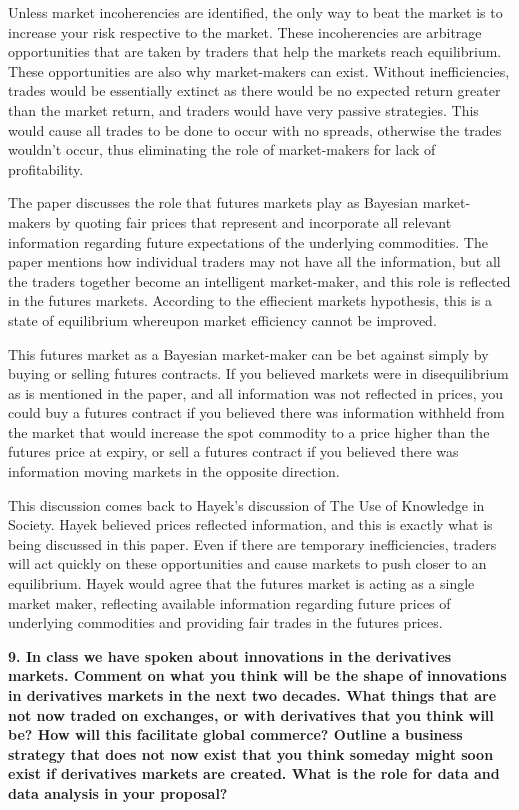 \documentclass[11pt]{article}
\begin{document}
Unless market incoherencies are identified, the only way to beat the
market is to increase your risk respective to the market. These
incoherencies are arbitrage opportunities that are taken by traders that
help the markets reach equilibrium. These opportunities are also why
market-makers can exist. Without inefficiencies, trades would be
essentially extinct as there would be no expected return greater than
the market return, and traders would have very passive strategies. This
would cause all trades to be done to occur with no spreads, otherwise
the trades wouldn't occur, thus eliminating the role of market-makers
for lack of profitability.

The paper discusses the role that futures markets play as Bayesian
market-makers by quoting fair prices that represent and incorporate all
relevant information regarding future expectations of the underlying
commodities. The paper mentions how individual traders may not have all
the information, but all the traders together become an intelligent
market-maker, and this role is reflected in the futures markets.
According to the effiecient markets hypothesis, this is a state of
equilibrium whereupon market efficiency cannot be improved.

This futures market as a Bayesian market-maker can be bet against simply
by buying or selling futures contracts. If you believed markets were in
disequilibrium as is mentioned in the paper, and all information was not
reflected in prices, you could buy a futures contract if you believed
there was information withheld from the market that would increase the
spot commodity to a price higher than the futures price at expiry, or
sell a futures contract if you believed there was information moving
markets in the opposite direction.

This discussion comes back to Hayek's discussion of The Use of Knowledge
in Society. Hayek believed prices reflected information, and this is
exactly what is being discussed in this paper. Even if there are
temporary inefficiencies, traders will act quickly on these
opportunities and cause markets to push closer to an equilibrium. Hayek
would agree that the futures market is acting as a single market maker,
reflecting available information regarding future prices of underlying
commodities and providing fair trades in the futures prices.

    \textbf{9. In class we have spoken about innovations in the derivatives
markets. Comment on what you think will be the shape of innovations in
derivatives markets in the next two decades. What things that are not
now traded on exchanges, or with derivatives that you think will be? How
will this facilitate global commerce? Outline a business strategy that
does not now exist that you think someday might soon exist if
derivatives markets are created. What is the role for data and data
analysis in your proposal?}
\end{document}

